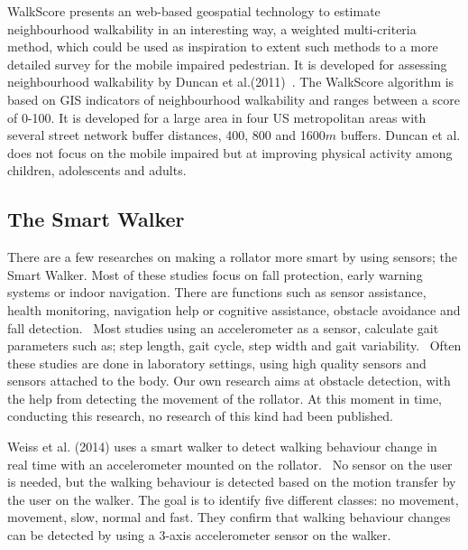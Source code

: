 WalkScore presents an web-based geospatial technology to estimate neighbourhood walkability in an interesting way, a weighted multi-criteria method, which could be used as inspiration to extent such methods to a more detailed survey for the mobile impaired pedestrian. It is developed for assessing neighbourhood walkability by Duncan et al.(2011)~\cite{Duncan2011}. The WalkScore algorithm is based on GIS indicators of neighbourhood walkability and ranges between a score of 0-100. It is developed for a large area in four US metropolitan areas with several street network buffer distances, 400, 800 and 1600$m$ buffers. Duncan et al. does not focus on the mobile impaired but at improving physical activity among children, adolescents and adults. 

\subsection{The Smart Walker}
There are a few researches on making a rollator more smart by using sensors; the Smart Walker. Most of these studies focus on fall protection, early warning systems or indoor navigation. There are functions such as sensor assistance, health monitoring, navigation help or cognitive assistance, obstacle avoidance and fall detection.~\cite{Wang2015} Most studies using an accelerometer as a sensor, calculate gait parameters such as; step length, gait cycle, step width and gait variability.~\cite{Wang2015} Often these studies are done in laboratory settings, using high quality sensors and sensors attached to the body. Our own research aims at obstacle detection, with the help from detecting the movement of the rollator. At this moment in time, conducting this research, no research of this kind had been published.

Weiss et al. (2014) uses a smart walker to detect walking behaviour change in real time with an accelerometer mounted on the rollator.~\cite{Weiss2014} No sensor on the user is needed, but the walking behaviour is detected based on the motion transfer by the user on the walker. The goal is to identify five different classes: no movement, movement, slow, normal and fast. They confirm that walking behaviour changes can be detected by using a 3-axis accelerometer sensor on the walker.~\cite{Weiss2014}

